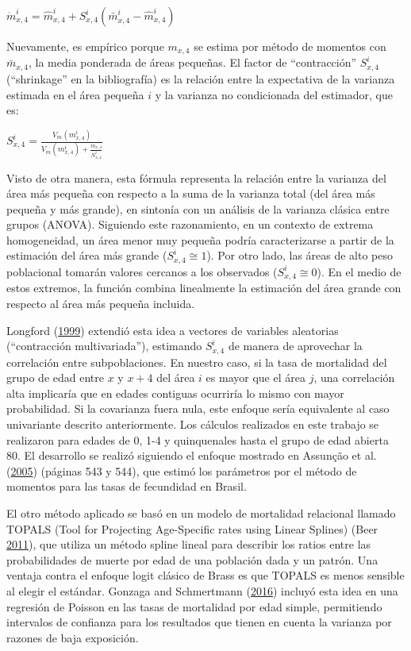 \documentclass[12pt,]{article}
\begin{document}
\(\mathring{m}_{x,4}^{i}=\hat{m}_{x, 4}^{i}+S_{x,4}^{i}(\bar{m}_{x,4}^{i}-\hat{m}_{x,4}^{i})\)

Nuevamente, es empírico porque \(m_{x,4}\) se estima por método de
momentos con \(\bar{m}_{x,4}\), la media ponderada de áreas pequeñas. El
factor de ``contracción'' \(S_{x, 4}^{i}\) (``shrinkage'' en la
bibliografía) es la relación entre la expectativa de la varianza
estimada en el área pequeña \(i\) y la varianza no condicionada del
estimador, que es:

\(S_{x,4}^{i}=\frac{V_{m}(m_{x,4}^{i})}{V_{m}(m_{x,4}^{i})+\frac{m_{x,4}}{N_{x,4}^{i}}}\)

Visto de otra manera, esta fórmula representa la relación entre la
varianza del área más pequeña con respecto a la suma de la varianza
total (del área más pequeña y más grande), en sintonía con un análisis
de la varianza clásica entre grupos (ANOVA). Siguiendo este
razonamiento, en un contexto de extrema homogeneidad, un área menor muy
pequeña podría caracterizarse a partir de la estimación del área más
grande (\(S_{x, 4} ^ {i} \cong 1\)). Por otro lado, las áreas de alto
peso poblacional tomarán valores cercanos a los observados
(\(S_{x,4}^{i}\cong 0\)). En el medio de estos extremos, la función
combina linealmente la estimación del área grande con respecto al área
más pequeña incluida.

Longford (\protect\hyperlink{ref-Longford1999}{1999}) extendió esta idea
a vectores de variables aleatorias (``contracción multivariada''),
estimando \(S_{x,4}^{i}\) de manera de aprovechar la correlación entre
subpoblaciones. En nuestro caso, si la tasa de mortalidad del grupo de
edad entre \(x\) y \(x+4\) del área \(i\) es mayor que el área \(j\),
una correlación alta implicaría que en edades contiguas ocurriría lo
mismo con mayor probabilidad. Si la covarianza fuera nula, este enfoque
sería equivalente al caso univariante descrito anteriormente. Los
cálculos realizados en este trabajo se realizaron para edades de 0, 1-4
y quinquenales hasta el grupo de edad abierta 80. El desarrollo se
realizó siguiendo el enfoque mostrado en Assunção et al.
(\protect\hyperlink{ref-Assuncao2005}{2005}) (páginas 543 y 544), que
estimó los parámetros por el método de momentos para las tasas de
fecundidad en Brasil.

El otro método aplicado se basó en un modelo de mortalidad relacional
llamado TOPALS (Tool for Projecting Age-Specific rates using Linear
Splines) (Beer \protect\hyperlink{ref-deBeer2011}{2011}), que utiliza un
método spline lineal para describir los ratios entre las probabilidades
de muerte por edad de una población dada y un patrón. Una ventaja contra
el enfoque logit clásico de Brass es que TOPALS es menos sensible al
elegir el estándar. Gonzaga and Schmertmann
(\protect\hyperlink{ref-Gonzaga_Schmertmann_2016}{2016}) incluyó esta
idea en una regresión de Poisson en las tasas de mortalidad por edad
simple, permitiendo intervalos de confianza para los resultados que
tienen en cuenta la varianza por razones de baja exposición.
\end{document}
